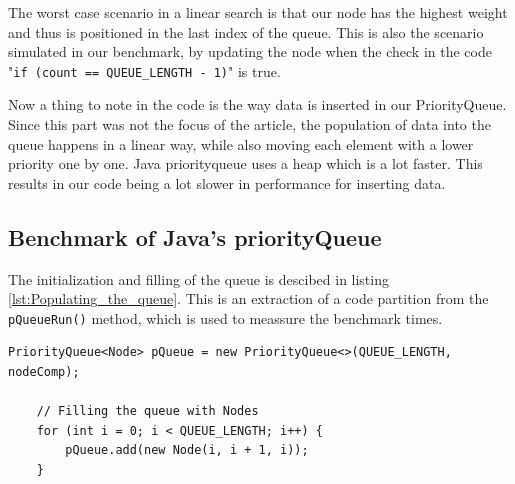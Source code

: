 \documentclass{article}
\begin{document}
The worst case scenario in a linear search is that our node has the highest 
weight and thus is positioned in the last index of the queue. 
This is also the scenario simulated in our benchmark, by updating the node 
when the check in the code "\lstinline{if (count == QUEUE_LENGTH - 1)}" is true.

Now a thing to note in the code is the way data is inserted in our PriorityQueue. 
Since this part was not the focus of the article, the population of data into the 
queue happens in a linear way, while also moving each element with a lower priority 
one by one. 
Java priorityqueue uses a heap which is a lot faster. This results in our code being 
a lot slower in performance for inserting data.


\subsection{Benchmark of Java's priorityQueue} %
\label{sec:javabenchmark}
The initialization and filling of the queue is descibed in listing \ref{lst:Populating_the_queue}. 
This is an extraction of a code partition from the \lstinline{pQueueRun()} method, 
which is used to meassure the benchmark times.

\begin{lstlisting}[caption={Populating the queue},label={lst:Populating_the_queue}]
    PriorityQueue<Node> pQueue = new PriorityQueue<>(QUEUE_LENGTH, nodeComp);

    // Filling the queue with Nodes
    for (int i = 0; i < QUEUE_LENGTH; i++) {
        pQueue.add(new Node(i, i + 1, i));
    }
\end{lstlisting}
\end{document}
